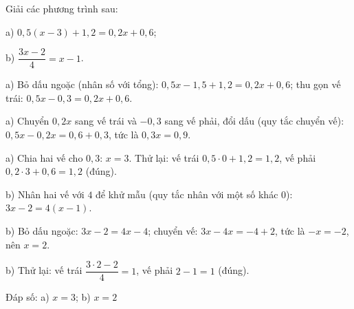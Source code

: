 \begin{problem}[8DS-PT1-037]
Giải các phương trình sau:

a) $0{,}5(x - 3) + 1{,}2 = 0{,}2x + 0{,}6$;

b) $\dfrac{3x - 2}{4} = x - 1$.

\begin{solution}
a) Bỏ dấu ngoặc (nhân số với tổng): $0{,}5x - 1{,}5 + 1{,}2 = 0{,}2x + 0{,}6$; thu gọn vế trái: $0{,}5x - 0{,}3 = 0{,}2x + 0{,}6$.

a) Chuyển $0{,}2x$ sang vế trái và $-0{,}3$ sang vế phải, đổi dấu (quy tắc chuyển vế): $0{,}5x - 0{,}2x = 0{,}6 + 0{,}3$, tức là $0{,}3x = 0{,}9$.

a) Chia hai vế cho $0{,}3$: $x = 3$. Thử lại: vế trái $0{,}5 \cdot 0 + 1{,}2 = 1{,}2$, vế phải $0{,}2 \cdot 3 + 0{,}6 = 1{,}2$ (đúng).

b) Nhân hai vế với $4$ để khử mẫu (quy tắc nhân với một số khác $0$): $3x - 2 = 4(x - 1)$.

b) Bỏ dấu ngoặc: $3x - 2 = 4x - 4$; chuyển vế: $3x - 4x = -4 + 2$, tức là $-x = -2$, nên $x = 2$.

b) Thử lại: vế trái $\dfrac{3 \cdot 2 - 2}{4} = 1$, vế phải $2 - 1 = 1$ (đúng).

Đáp số: a) $\boxed{x = 3}$; b) $\boxed{x = 2}$
\end{solution}
\end{problem}


